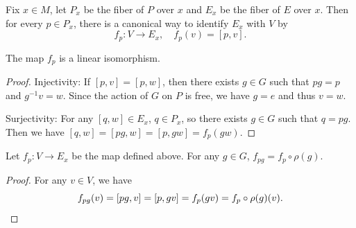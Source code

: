 Fix $x\in M$, let $P_x$ be the fiber of $P$ over $x$ and $E_x$ be the fiber of $E$ over $x$. 
Then for every $p\in P_x$, there is a canonical way to identify $E_x$ with $V$ by 
\begin{equation*}
    f_p: V\to E_x, \quad f_p(v) = [p, v].
\end{equation*}
\begin{lemma}
    The map $f_p$ is a linear isomorphism.
\end{lemma}
\begin{proof}
    Injectivity: If $[p, v]=[p, w]$, then there exists $g\in G$ such that $pg=p$ and $g^{-1}v=w$. 
    Since the action of $G$ on $P$ is free, we have $g=e$ and thus $v=w$. 

    Surjectivity: For any $[q,w]\in E_x$, $q\in P_x$, so there exists $g\in G$ such that $q=pg$. 
    Then we have $[q,w] = [pg, w] = [p, gw] = f_p(gw)$. 
\end{proof}
\begin{lemma}\label{lem:G-equivariance-of-fp}
    Let $f_p: V\to E_x$ be the map defined above. 
    For any $g\in G$, $f_{pg} = f_p\circ \rho(g)$.
\end{lemma}
\begin{proof}
    For any $v\in V$, we have 
    \begin{equation*}
        f_{pg}(v) = [pg, v] = [p, gv] = f_p(gv) = f_p\circ \rho(g)(v). \qedhere
    \end{equation*}
\end{proof}


